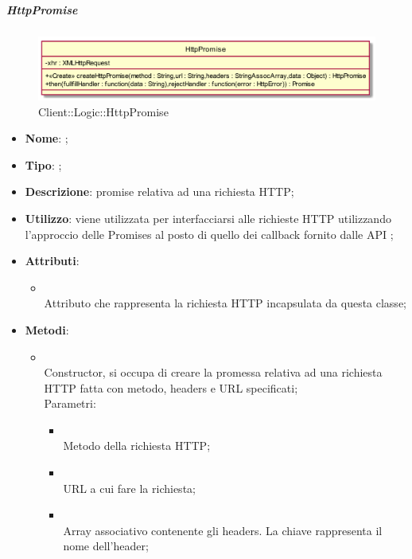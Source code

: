 \hypertarget{HttpPromise_label}{\subparagraph{HttpPromise}}
\begin{figure}[h]
	\centering
	\includegraphics[width=\textwidth,height=\textheight,keepaspectratio]{images/ClassHttpPromise.png}
	\caption{Client::Logic::HttpPromise}
\end{figure}
\begin{itemize}
	\item \textbf{Nome}: ;
	\item \textbf{Tipo}: ;
	\item \textbf{Descrizione}: promise relativa ad una richiesta HTTP;
	\item \textbf{Utilizzo}: viene utilizzata per interfacciarsi alle richieste HTTP utilizzando l'approccio delle Promises al posto di quello dei callback fornito dalle API ;
	\item \textbf{Attributi}:
	\begin{itemize}
		\item[]  \\
		Attributo che rappresenta la richiesta HTTP incapsulata da questa classe;
	\end{itemize}
	\item \textbf{Metodi}:
	\begin{itemize}
		\item[]  \\		Constructor, si occupa di creare la promessa relativa ad una richiesta HTTP fatta con metodo, headers e URL specificati;\\
		Parametri:
		\begin{itemize}
			\item {} \\
			Metodo della richiesta HTTP;
			\item {} \\
			URL a cui fare la richiesta;
			\item {} \\
			Array associativo contenente gli headers. La chiave rappresenta il nome dell'header;

\end{itemize}
\end{itemize}
\end{itemize}
